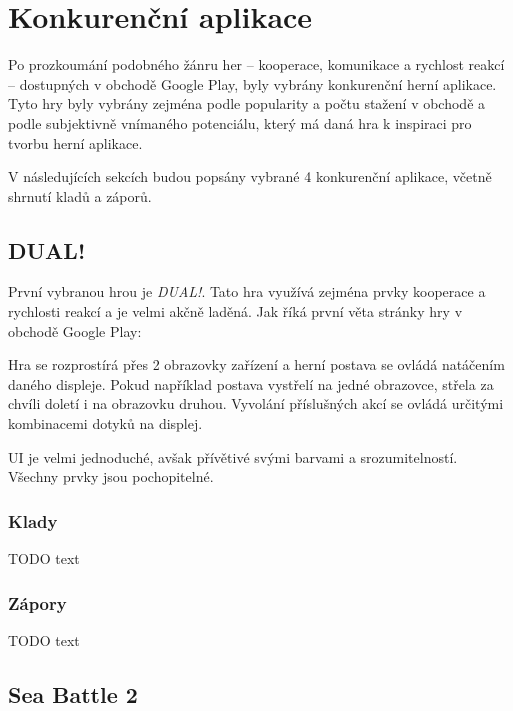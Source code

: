 \chapter{Konkurenční aplikace}

Po prozkoumání podobného žánru her
– kooperace, komunikace a rychlost reakcí –
dostupných v obchodě Google Play,
byly vybrány konkurenční herní aplikace.
Tyto hry byly vybrány zejména podle popularity a počtu stažení v obchodě
a podle subjektivně vnímaného potenciálu,
který má daná hra k inspiraci pro tvorbu herní aplikace.

V následujících sekcích budou popsány vybrané 4 konkurenční aplikace,
včetně shrnutí kladů a záporů.

\section{DUAL!}

První vybranou hrou je \emph{DUAL!}.
Tato hra využívá zejména prvky kooperace a rychlosti reakcí
a je velmi akčně laděná.
Jak říká první věta stránky hry \cite{seabaa_dual} v obchodě Google Play:

Hra se rozprostírá přes 2 obrazovky zařízení a herní postava se ovládá natáčením
daného displeje.
Pokud například postava vystřelí na jedné obrazovce,
střela za chvíli doletí i na obrazovku druhou.
Vyvolání příslušných akcí se ovládá určitými kombinacemi dotyků na displej.

UI je velmi jednoduché, avšak přívětivé svými barvami a srozumitelností.
Všechny prvky jsou pochopitelné.

\FloatBarrier

\subsection{Klady}

TODO text

\subsection{Zápory}

TODO text

\section{Sea Battle 2}

